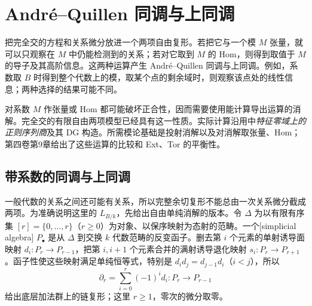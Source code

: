 
\section{André–Quillen 同调与上同调}
\label{b3:sec:C06}

把完全交的方程和关系微分放进一个两项自由复形。若把它与一个模 \(M\) 张量，就可以只观察在 \(M\) 中仍能检测到的关系；若对它取到 \(M\) 的 Hom，则得到取值于 \(M\) 的导子及其高阶信息。这两种运算产生 André–Quillen 同调与上同调。例如，系数取 \(B\) 时得到整个代数上的模，取某个点的剩余域时，则观察该点处的线性信息；两种选择的结果可能不同。

\ProseParagraphBreak
对系数 \(M\) 作张量或 Hom 都可能破坏正合性，因而需要使用能计算导出运算的消解。完全交的有限自由两项模型已经具有这一性质。实际计算沿用中\emph{特征零域上的正则序列商}及其 DG 构造。所需模论基础是投射消解以及对消解取张量、Hom；第四卷第9章给出了这些运算的比较和 Ext、Tor 的平衡性。

\subsection{带系数的同调与上同调}
\label{b3:subsec:C06:01}

一般代数的关系之间还可能有关系，所以完整余切复形不能总由一次关系微分截成两项。为准确说明这里的 \(L_{B/k}\)，先给出自由单纯消解的版本。令 \(\Delta\) 为以有限有序集 \([r]=\{0,\ldots,r\}\)（\(r\ge0\)）为对象、以保序映射为态射的范畴。一个[simplicial algebra] \(P_\bullet\) 是从 \(\Delta\) 到交换 \(k\) 代数范畴的反变函子。删去第 \(i\) 个元素的单射诱导面映射 \(d_i:P_r\to P_{r-1}\)，把第 \(i,i+1\) 个元素合并的满射诱导退化映射 \(s_i:P_r\to P_{r+1}\)。函子性使这些映射满足单纯恒等式，特别是 \(d_id_j=d_{j-1}d_i\)（\(i<j\)），所以
\[
	\partial_r=\sum_{i=0}^r(-1)^i d_i:P_r\longrightarrow P_{r-1}
\]
给出底层加法群上的链复形；这里 \(r\ge1\)，零次的微分取零。

